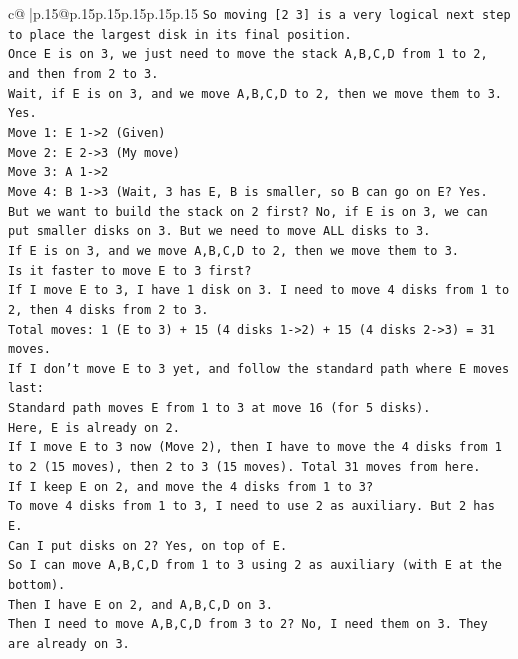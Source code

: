 \documentclass{article}
\begin{document}
{\begin{supertabular}{c@{$\;$}|p{.15\linewidth}@{}p{.15\linewidth}p{.15\linewidth}p{.15\linewidth}p{.15\linewidth}p{.15\linewidth}}
{{{\texttt{So moving {[}2 3{]} is a very logical next step to place the largest disk in its final position.} \\
\texttt{Once E is on 3, we just need to move the stack A,B,C,D from 1 to 2, and then from 2 to 3.} \\
\texttt{Wait, if E is on 3, and we move A,B,C,D to 2, then we move them to 3.} \\
\texttt{Yes.} \\
\texttt{Move 1: E 1{-}>2 (Given)} \\
\texttt{Move 2: E 2{-}>3 (My move)} \\
\texttt{Move 3: A 1{-}>2} \\
\texttt{Move 4: B 1{-}>3 (Wait, 3 has E, B is smaller, so B can go on E? Yes. But we want to build the stack on 2 first? No, if E is on 3, we can put smaller disks on 3. But we need to move ALL disks to 3.} \\
\texttt{If E is on 3, and we move A,B,C,D to 2, then we move them to 3.} \\
\texttt{Is it faster to move E to 3 first?} \\
\texttt{If I move E to 3, I have 1 disk on 3. I need to move 4 disks from 1 to 2, then 4 disks from 2 to 3.} \\
\texttt{Total moves: 1 (E to 3) + 15 (4 disks 1{-}>2) + 15 (4 disks 2{-}>3) = 31 moves.} \\
\texttt{If I don't move E to 3 yet, and follow the standard path where E moves last:} \\
\texttt{Standard path moves E from 1 to 3 at move 16 (for 5 disks).} \\
\texttt{Here, E is already on 2.} \\
\texttt{If I move E to 3 now (Move 2), then I have to move the 4 disks from 1 to 2 (15 moves), then 2 to 3 (15 moves). Total 31 moves from here.} \\
\texttt{If I keep E on 2, and move the 4 disks from 1 to 3?} \\
\texttt{To move 4 disks from 1 to 3, I need to use 2 as auxiliary. But 2 has E.} \\
\texttt{Can I put disks on 2? Yes, on top of E.} \\
\texttt{So I can move A,B,C,D from 1 to 3 using 2 as auxiliary (with E at the bottom).} \\
\texttt{Then I have E on 2, and A,B,C,D on 3.} \\
\texttt{Then I need to move A,B,C,D from 3 to 2? No, I need them on 3. They are already on 3.} \\
}}}
\end{supertabular}}
\end{document}
